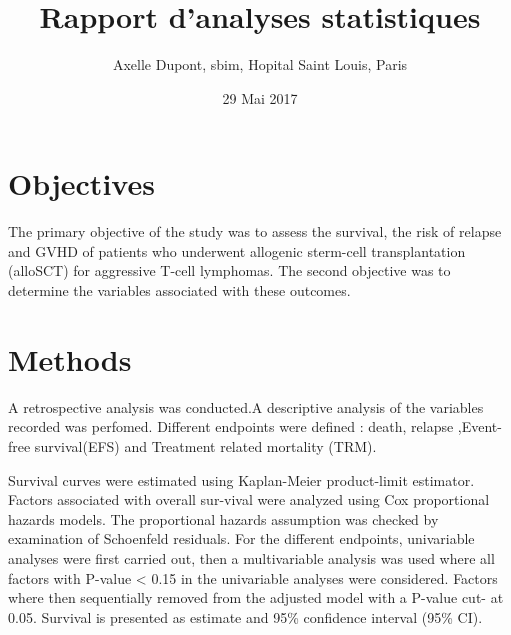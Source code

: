 \documentclass[a4paper,11pt] {article}
\begin{document}
\title{Rapport  d'analyses statistiques}
\author{Axelle Dupont, sbim, Hopital Saint Louis, Paris}
\date{29 Mai 2017}















\maketitle

\tableofcontents
\pagebreak[4]
\listoftables
\listoffigures


\pagebreak[4]

\section{Objectives}

The primary objective of the study was to assess the survival, the risk of relapse and GVHD  of patients who underwent allogenic sterm-cell transplantation (alloSCT) for aggressive T-cell lymphomas. 
The second objective was to determine the variables associated with these outcomes.

\section{Methods}

A  retrospective analysis was conducted.A descriptive analysis of the variables recorded was perfomed. Different endpoints were defined : death, relapse ,Event-free survival(EFS) and Treatment related mortality (TRM).

Survival curves were estimated using Kaplan-Meier product-limit estimator. Factors associated with overall sur-vival were analyzed using Cox proportional hazards models. The proportional hazards assumption was checked by examination of Schoenfeld residuals.
For the different endpoints, univariable analyses were first carried out, then a multivariable analysis was used where all factors with P-value < 0.15 in the univariable analyses were considered. Factors where then sequentially removed from the adjusted model with a P-value cut- at 0.05. 
Survival is presented as estimate and 95\% confidence interval (95\% CI).
\end{document}
